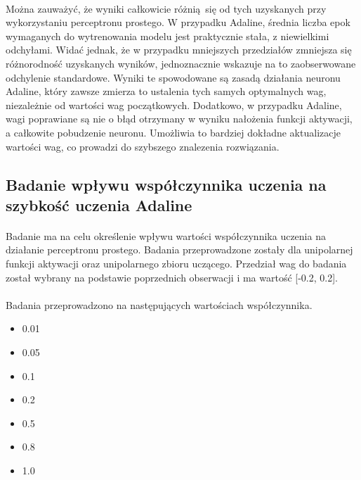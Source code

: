 \documentclass[\main/main.tex]{subfiles}
\begin{document}
    \paragraph{}
    Można zauważyć, że wyniki całkowicie różnią się od tych uzyskanych przy wykorzystaniu perceptronu prostego. W przypadku Adaline, średnia liczba epok wymaganych do wytrenowania modelu jest praktycznie stała, z niewielkimi odchyłami. Widać jednak, że w przypadku mniejszych przedziałów zmniejsza się różnorodność uzyskanych wyników, jednoznacznie wskazuje na to zaobserwowane odchylenie standardowe. Wyniki te spowodowane są zasadą działania neuronu Adaline, który zawsze zmierza to ustalenia tych samych optymalnych wag, niezależnie od wartości wag początkowych. Dodatkowo, w przypadku Adaline, wagi poprawiane są nie o błąd otrzymany w wyniku nałożenia funkcji aktywacji, a całkowite pobudzenie neuronu. Umożliwia to bardziej dokładne aktualizacje wartości wag, co prowadzi do szybszego znalezenia rozwiązania.

    \justify
    \subsection{Badanie wpływu współczynnika uczenia  na szybkość uczenia Adaline}
    \paragraph{}
    Badanie ma na celu określenie wpływu wartości współczynnika uczenia na działanie perceptronu prostego. Badania przeprowadzone zostały dla unipolarnej funkcji aktywacji oraz unipolarnego zbioru uczącego. Przedział wag do badania został wybrany na podstawie poprzednich obserwacji i ma wartość [-0.2, 0.2].
    
    \paragraph{}
    Badania przeprowadzono na następujących wartościach współczynnika.
    \begin{itemize}
    \item 0.01
    \item 0.05
    \item 0.1
    \item 0.2
    \item 0.5
    \item 0.8
    \item 1.0
    \end{itemize}
    
\end{document}
